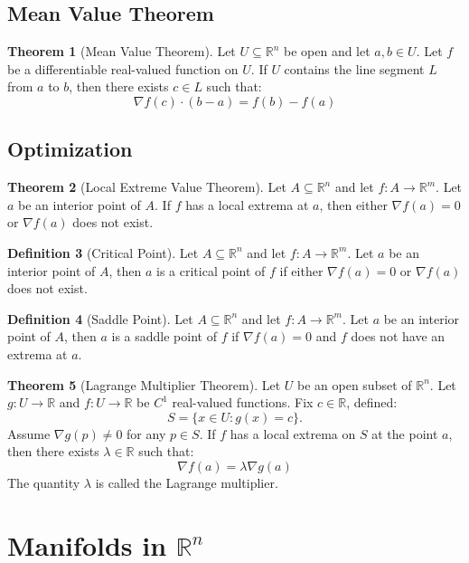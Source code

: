 \documentclass[12pt]{article}
\theoremstyle{definition}
\newtheorem{definition}{Definition}[subsection]
\newtheorem{theorem}[definition]{Theorem}
\theoremstyle{remark}
\begin{document}
\subsection{Mean Value Theorem}
\begin{theorem}[Mean Value Theorem]
Let $U\subseteq\mathbb{R}^n$ be open and let $a,b\in U$. Let $f$ be a differentiable real-valued function on $U$. If $U$ contains the line segment $L$ from $a$ to $b$, then there exists $c\in L$ such that:
\[
\nabla f(c)\cdot(b-a)=f(b)-f(a)
\]
\end{theorem}
\subsection{Optimization}
\begin{theorem}[Local Extreme Value Theorem]
Let $A\subseteq\mathbb{R}^n$ and let $f:A\to\mathbb{R}^m$. Let $a$ be an interior point of $A$. If $f$ has a local extrema at $a$, then either $\nabla f(a)=0$ or $\nabla f(a)$ does not exist.
\end{theorem}

\begin{definition}[Critical Point]
Let $A\subseteq\mathbb{R}^n$ and let $f:A\to\mathbb{R}^m$. Let $a$ be an interior point of $A$, then $a$ is a critical point of $f$ if either $\nabla f(a)=0$ or $\nabla f(a)$ does not exist.
\end{definition}

\begin{definition}[Saddle Point]
Let $A\subseteq\mathbb{R}^n$ and let $f:A\to\mathbb{R}^m$. Let $a$ be an interior point of $A$, then $a$ is a saddle point of $f$ if  $\nabla f(a)=0$ and $f$ does not have an extrema at $a$.
\end{definition}

\begin{theorem}[Lagrange Multiplier Theorem]
Let $U$ be an open subset of $\mathbb{R}^n$. Let $g:U\to\mathbb{R}$ and $f:U\to\mathbb{R}$ be $C^1$ real-valued functions. Fix $c\in\mathbb{R}$, defined:
\[
S=\{x\in U: g(x)=c\}.
\]
Assume $\nabla g(p)\ne 0$ for any $p\in S$. If $f$ has a local extrema on $S$ at the point $a$, then there exists $\lambda\in\mathbb{R}$ such that:
\[
\nabla f(a)=\lambda\nabla g(a)
\]
The quantity $\lambda$ is called the Lagrange multiplier.
\end{theorem}

\section{Manifolds in $\mathbb{R}^n$}
\end{document}
